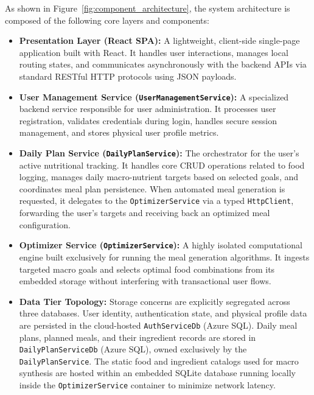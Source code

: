 As shown in Figure~\ref{fig:component_architecture}, the system architecture is composed of 
the following core layers and components:

\begin{itemize}
    \item \textbf{Presentation Layer (React SPA):} A lightweight, client-side single-page 
    application built with React. It handles user interactions, manages local routing states, 
    and communicates asynchronously with the backend APIs via standard RESTful HTTP protocols 
    using JSON payloads.
    \item \textbf{User Management Service (\texttt{UserManagementService}):} A specialized 
    backend service responsible for user administration. It processes user registration, 
    validates credentials during login, handles secure session management, and stores physical 
    user profile metrics.
    \item \textbf{Daily Plan Service (\texttt{DailyPlanService}):} The orchestrator for 
    the user's active nutritional tracking. It handles core CRUD operations related to food
    logging, manages daily macro-nutrient targets based on selected goals, and coordinates
    meal plan persistence. When automated meal generation is requested, it delegates to the
    \texttt{OptimizerService} via a typed \texttt{HttpClient}, forwarding the user's 
    targets and receiving back an optimized meal configuration.
    \item \textbf{Optimizer Service (\texttt{OptimizerService}):} A highly isolated 
    computational engine built exclusively for running the meal generation algorithms. It 
    ingests targeted macro goals and selects optimal food combinations from its embedded 
    storage without interfering with transactional user flows.
    \item \textbf{Data Tier Topology:} Storage concerns are explicitly segregated across
    three databases. User identity, authentication state, and physical profile data are
    persisted in the cloud-hosted \texttt{AuthServiceDb} (Azure SQL). Daily meal plans,
    planned meals, and their ingredient records are stored in \texttt{DailyPlanServiceDb}
    (Azure SQL), owned exclusively by the \texttt{DailyPlanService}. The static food and
    ingredient catalogs used for macro synthesis are hosted within an embedded SQLite
    database running locally inside the \texttt{OptimizerService} container to minimize
    network latency.
\end{itemize}

